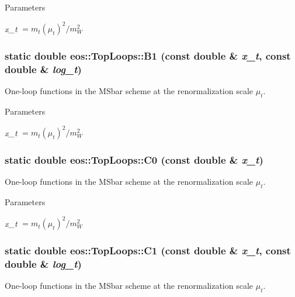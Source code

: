 \begin{DoxyParams}{Parameters}
\item[{\em x\_\-t}]$= m_t(\mu_t)^2 / m_W^2$ \end{DoxyParams}
\hypertarget{structeos_1_1TopLoops_a9f07487a5ca27483a4e7a80089137f39}{
\subsubsection[{B1}]{\setlength{\rightskip}{0pt plus 5cm}static double eos::TopLoops::B1 (const double \& {\em x\_\-t}, \/  const double \& {\em log\_\-t})}}
\label{structeos_1_1TopLoops_a9f07487a5ca27483a4e7a80089137f39}
One-\/loop functions in the MSbar scheme at the renormalization scale $\mu_t$.


\begin{DoxyParams}{Parameters}
\item[{\em x\_\-t}]$= m_t(\mu_t)^2 / m_W^2$ \end{DoxyParams}
\hypertarget{structeos_1_1TopLoops_ae0a4305960619de35b6485ba3ed2ff47}{
\subsubsection[{C0}]{\setlength{\rightskip}{0pt plus 5cm}static double eos::TopLoops::C0 (const double \& {\em x\_\-t})}}
\label{structeos_1_1TopLoops_ae0a4305960619de35b6485ba3ed2ff47}
One-\/loop functions in the MSbar scheme at the renormalization scale $\mu_t$.


\begin{DoxyParams}{Parameters}
\item[{\em x\_\-t}]$= m_t(\mu_t)^2 / m_W^2$ \end{DoxyParams}
\hypertarget{structeos_1_1TopLoops_a9ffd030324501af9b5843456a6d5ff05}{
\subsubsection[{C1}]{\setlength{\rightskip}{0pt plus 5cm}static double eos::TopLoops::C1 (const double \& {\em x\_\-t}, \/  const double \& {\em log\_\-t})}}
\label{structeos_1_1TopLoops_a9ffd030324501af9b5843456a6d5ff05}
One-\/loop functions in the MSbar scheme at the renormalization scale $\mu_t$.


